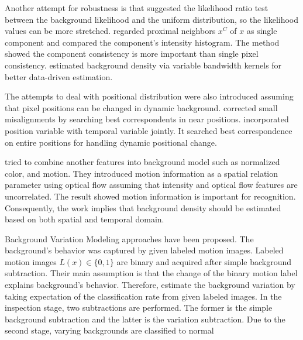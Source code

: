 \documentclass[conference]{IEEEtran}
\begin{document}
Another attempt for robustness is that \cite{Sheikh} suggested the likelihood ratio test between the background likelihood and the uniform distribution, so the likelihood values can be more stretched. \cite{Ko} regarded proximal neighbors \begin{math} x^C \end{math} of \begin{math} x \end{math} as single component and compared the component's intensity histogram. The method showed the component consistency is more important than single pixel consistency. \cite{Mittal} estimated background density via variable bandwidth kernels for better data-driven estimation.

The attempts to deal with positional distribution were also introduced assuming that pixel positions can be changed in dynamic background. \cite{Elgammal} corrected small misalignments by searching best correspondents in near positions. \cite{Sheikh} incorporated position variable with temporal variable jointly. It searched best correspondence on entire positions for handling dynamic positional change.

\cite{Mittal} tried to combine another features into background model such as normalized color, and motion. They introduced motion information as a spatial relation parameter using optical flow assuming that intensity and optical flow features are uncorrelated. The result showed motion information is important for recognition. Consequently, the work implies that background density should be estimated based on both spatial and temporal domain.

  Background Variation Modeling approaches \cite{Jodoin, Bebezeth} have been proposed. The background’s behavior was captured by given labeled motion images. Labeled motion images \begin{math} L(x) \in \{0, 1\} \end{math}  are binary and acquired after simple background subtraction. Their main assumption is that the change of the binary motion label explains background's behavior. Therefore, \cite{Jodoin, Bebezeth} estimate the background variation by taking expectation of the classification rate from given labeled images. In the inspection stage, two subtractions are performed. The former is the simple background subtraction and the latter is the variation subtraction. Due to the second stage, varying backgrounds are classified to normal 
\end{document}
